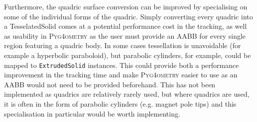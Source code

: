 \documentclass[final,5p,times,twocolumn]{elsarticle}
\newcommand{\pyinline}[1]{\lstinline[postbreak={}]{#1}}
\newcommand{\PYGEOMETRY}{\textsc{Pyg4ometry}}
\begin{document}
Furthermore, the quadric surface conversion can be improved by specialising
on some of the individual forms of the quadric.  Simply converting every
quadric into a TesselatedSolid comes at a potential performance cost in the
tracking, as well as usability in \PYGEOMETRY{} as the user must provide an
AABB for every single region featuring a quadric body.  In some cases
tessellation is unavoidable (for example a hyperbolic paraboloid), but
parabolic cylinders, for example, could be mapped to \pyinline{ExtrudedSolid}
instances.
This could provide both a performance improvement in the tracking time and
make \PYGEOMETRY{} easier to use as an AABB would not need to be provided
beforehand.  This has not been implemented as quadrics are relatively
rarely used, but where quadrics are used, it is often in the form of
parabolic cylinders (e.g. magnet pole tips) and this specialisation in
particular would be worth implementing.
\end{document}
